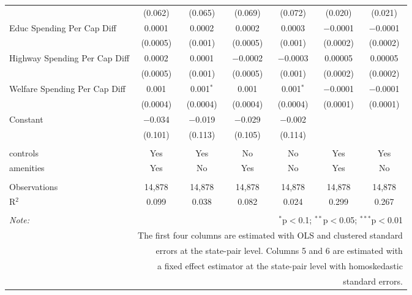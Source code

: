\begin{table}[!htbp]
\begin{tabular}{@{\extracolsep{5pt}}lcccccc}
  & (0.062) & (0.065) & (0.069) & (0.072) & (0.020) & (0.021) \\ 
  Educ Spending Per Cap Diff & 0.0001 & 0.0002 & 0.0002 & 0.0003 & $-$0.0001 & $-$0.0001 \\ 
  & (0.0005) & (0.001) & (0.0005) & (0.001) & (0.0002) & (0.0002) \\ 
  Highway Spending Per Cap Diff & 0.0002 & 0.0001 & $-$0.0002 & $-$0.0003 & 0.00005 & 0.00005 \\ 
  & (0.0005) & (0.001) & (0.0005) & (0.001) & (0.0002) & (0.0002) \\ 
  Welfare Spending Per Cap Diff & 0.001 & 0.001$^{*}$ & 0.001 & 0.001$^{*}$ & $-$0.0001 & $-$0.0001 \\ 
  & (0.0004) & (0.0004) & (0.0004) & (0.0004) & (0.0001) & (0.0001) \\ 
  Constant & $-$0.034 & $-$0.019 & $-$0.029 & $-$0.002 &  &  \\ 
  & (0.101) & (0.113) & (0.105) & (0.114) &  &  \\ 
 \hline \\[-1.8ex] 
controls & Yes & Yes & No & No & Yes & Yes \\ 
amenities & Yes & No & Yes & No & Yes & No \\ 
\hline \\[-1.8ex] 
Observations & 14,878 & 14,878 & 14,878 & 14,878 & 14,878 & 14,878 \\ 
R$^{2}$ & 0.099 & 0.038 & 0.082 & 0.024 & 0.299 & 0.267 \\ 
\hline 
\hline \\[-1.8ex] 
\textit{Note:}  & \multicolumn{6}{r}{$^{*}$p$<$0.1; $^{**}$p$<$0.05; $^{***}$p$<$0.01} \\ 
 & \multicolumn{6}{r}{The first four columns are estimated with OLS and clustered standard} \\ 
 & \multicolumn{6}{r}{ errors at the state-pair level. Columns 5 and 6 are estimated with} \\ 
 & \multicolumn{6}{r}{a fixed effect estimator at the state-pair level with homoskedastic} \\ 
 & \multicolumn{6}{r}{standard errors.} \\ 
\end{tabular} 
\end{table} 
